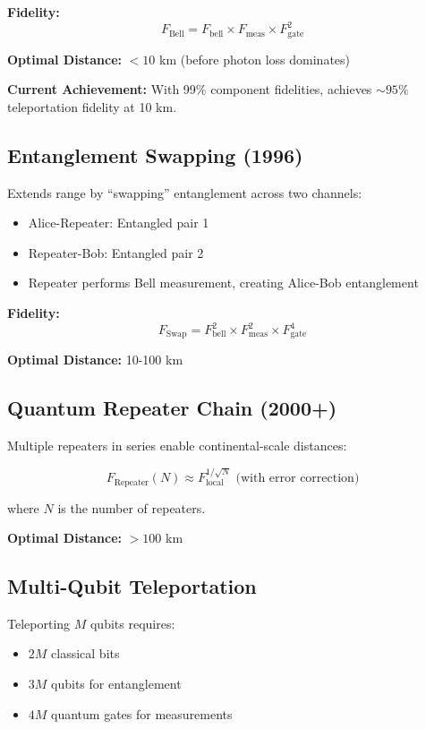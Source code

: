 \documentclass[11pt,a4paper]{article}
\begin{document}
\textbf{Fidelity:}
$$F_{\text{Bell}} = F_{\text{bell}} \times F_{\text{meas}} \times F_{\text{gate}}^2$$

\textbf{Optimal Distance:} $< 10$ km (before photon loss dominates)

\textbf{Current Achievement:} With 99\% component fidelities, achieves $\sim95\%$ teleportation fidelity at 10 km.

\subsection{Entanglement Swapping (1996)}

Extends range by ``swapping'' entanglement across two channels:
\begin{itemize}
    \item Alice-Repeater: Entangled pair 1
    \item Repeater-Bob: Entangled pair 2
    \item Repeater performs Bell measurement, creating Alice-Bob entanglement
\end{itemize}

\textbf{Fidelity:}
$$F_{\text{Swap}} = F_{\text{bell}}^2 \times F_{\text{meas}}^2 \times F_{\text{gate}}^4$$

\textbf{Optimal Distance:} 10-100 km

\subsection{Quantum Repeater Chain (2000+)}

Multiple repeaters in series enable continental-scale distances:

$$F_{\text{Repeater}}(N) \approx F_{\text{local}}^{1/\sqrt{N}} \text{ (with error correction)}$$

where $N$ is the number of repeaters.

\textbf{Optimal Distance:} $> 100$ km

\subsection{Multi-Qubit Teleportation}

Teleporting $M$ qubits requires:
\begin{itemize}
    \item $2M$ classical bits
    \item $3M$ qubits for entanglement
    \item $4M$ quantum gates for measurements
\end{itemize}
\end{document}
